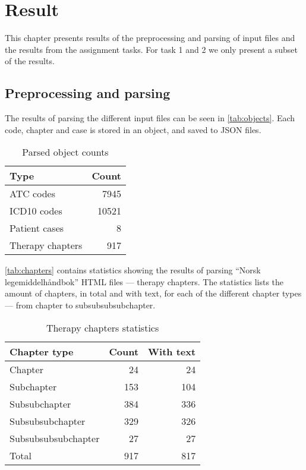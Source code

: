 \chapter{Result}
\label{cha:result}
This chapter presents results of the preprocessing and parsing of input files and the results from the assignment tasks. For task 1 and 2 we only present a subset of the results.

\section{Preprocessing and parsing}
The results of parsing the different input files can be seen in
\autoref{tab:objects}. Each code, chapter and case is stored in an object,
and saved to JSON files.
\begin{table}[htbp] \footnotesize \center
\caption{Parsed object counts\label{tab:objects}}
\begin{tabular}{l r}
    \toprule
    Type & Count \\
    \midrule
	ATC codes & 7945 \\
	ICD10 codes & 10521 \\
	Patient cases & 8 \\
	Therapy chapters & 917 \\
	\bottomrule
\end{tabular}
\end{table}

\autoref{tab:chapters} contains statistics showing the results of parsing
``Norsk legemiddelhåndbok'' HTML files --- therapy chapters. The statistics
lists the amount of chapters, in total and with text, for each of the
different chapter types --- from chapter to subsubsubsubchapter.
\begin{table}[htbp] \footnotesize \center
\caption{Therapy chapters statistics\label{tab:chapters}}
\begin{tabular}{l r r}
    \toprule
    Chapter type & Count & With text \\
    \midrule
	Chapter & 24 & 24 \\
	Subchapter & 153 & 104 \\
	Subsubchapter & 384 & 336 \\
	Subsubsubchapter & 329 & 326 \\
	Subsubsubsubchapter & 27 & 27 \\
    \midrule
	Total & 917 & 817 \\
	\bottomrule
\end{tabular}
\end{table}

